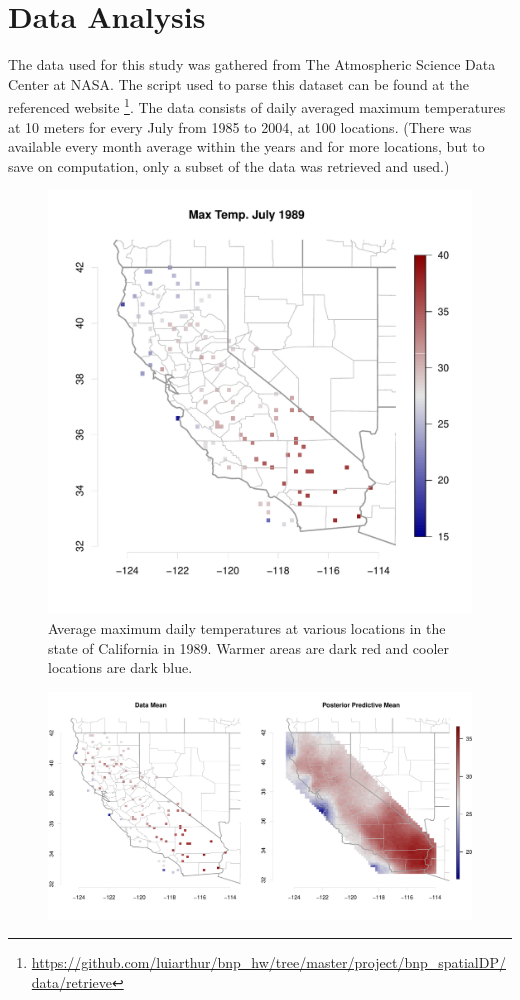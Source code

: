 \documentclass[11pt]{article}
\def\beginmyfig{\begin{figure}[h]\center}
\def\endmyfig{\end{figure}}
\begin{document}
\section{Data Analysis}
The data used for this study was gathered from The Atmospheric Science Data
Center at NASA. The script used to parse this dataset can be found at the
referenced website
\footnote{\url{https://github.com/luiarthur/bnp_hw/tree/master/project/bnp_spatialDP/data/retrieve}}.
The data consists of daily averaged maximum temperatures at 10 meters for every
July from 1985 to 2004, at 100 locations. (There was available every month
average within the years and for more locations, but to save on computation,
only a subset of the data was retrieved and used.) 

\beginmyfig 
  \includegraphics[scale=.5]{../graphs/july1989.pdf} 
  \caption{Average maximum daily temperatures at various locations in the state of California in 1989. 
  Warmer areas are dark red and cooler locations are dark blue.}
  \label{fig:dat}
\endmyfig

\beginmyfig
  \includegraphics[scale=.5]{../graphs/postpredmean.pdf}
  \caption{}
  \label{fig:postpred}
\endmyfig
\end{document}
